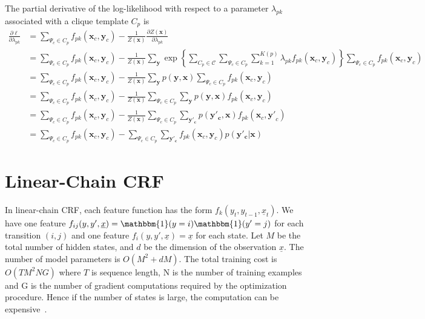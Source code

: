 The partial derivative of the log-likelihood with respect to a parameter
$\lambda_{pk}$ associated with a clique template $C_p$ is
\begin{align*}
\frac{\partial\ell}{\partial\lambda_{pk}}
&= \sum_{\Psi_c\in C_p}f_{pk}(\mathbf{x}_c, \mathbf{y}_c) -
\frac{1}{Z(\mathbf{x})}\frac{\partial Z(\mathbf{x})}{\partial\lambda_{pk}}\\
&= \sum_{\Psi_c\in C_p}f_{pk}(\mathbf{x}_c, \mathbf{y}_c) -
\frac{1}{Z(\mathbf{x})}\sum_{\mathbf{y}}\exp\left\{\sum_{C_p\in\mathcal{C}}\sum_{\Psi_c\in
C_p}\sum_{k=1}^{K(p)}\lambda_{pk}f_{pk}(\mathbf{x}_c,
\mathbf{y}_c)\right\}\sum_{\Psi_c\in C_p}f_{pk}(\mathbf{x}_c, \mathbf{y}_c) \\
&= \sum_{\Psi_c\in C_p}f_{pk}(\mathbf{x}_c, \mathbf{y}_c) -
\frac{1}{Z(\mathbf{x})}\sum_{\mathbf{y}}p(\mathbf{y}, \mathbf{x})\sum_{\Psi_c\in
C_p}f_{pk}(\mathbf{x}_c, \mathbf{y}_c) \\
&= \sum_{\Psi_c\in C_p}f_{pk}(\mathbf{x}_c, \mathbf{y}_c) -
\frac{1}{Z(\mathbf{x})}\sum_{\Psi_c\in C_p}\sum_{\mathbf{y}}p(\mathbf{y},
\mathbf{x})f_{pk}(\mathbf{x}_c, \mathbf{y}_c) \\
&= \sum_{\Psi_c\in C_p}f_{pk}(\mathbf{x}_c, \mathbf{y}_c) -
\frac{1}{Z(\mathbf{x})}\sum_{\Psi_c\in C_p}\sum_{\mathbf{y'_c}}p(\mathbf{y'_c},
\mathbf{x})f_{pk}(\mathbf{x}_c, \mathbf{y'}_c) \\
&= \sum_{\Psi_c\in C_p}f_{pk}(\mathbf{x}_c, \mathbf{y}_c) -
\sum_{\Psi_c\in C_p}\sum_{\mathbf{y'_c}}f_{pk}(\mathbf{x}_c, \mathbf{y}_c)p(\mathbf{y'_c}
| \mathbf{x})
\end{align*}

\section{Linear-Chain CRF}\label{sec:linear-crf}
In linear-chain CRF, each feature function has the form $f_k(y_t, y_{t-1},
\underline{x}_t)$.
We have one feature $f_{ij}(y, y', \underline{x}) =
\mathbbm{1}(y=i)\mathbbm{1}(y'=j)$ for each transition $(i, j)$ and one feature
$f_i(y, y', \underline{x}) = \underline{x}$ for each state.
Let $M$ be the total number of hidden states, and $d$ be the dimension of the
observation $\underline{x}$. The number of model parameters is $O(M^2 + dM)$.
The total training cost is $O(TM^2NG)$ where $T$ is sequence length, N is the
number of training examples and G is the number of gradient computations
required by the optimization procedure. Hence if the number of states is large,
the computation can be expensive~\cite{sutton06}.

